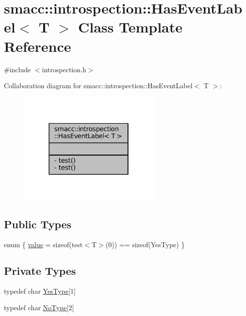 \hypertarget{classsmacc_1_1introspection_1_1HasEventLabel}{}\section{smacc\+:\+:introspection\+:\+:Has\+Event\+Label$<$ T $>$ Class Template Reference}
\label{classsmacc_1_1introspection_1_1HasEventLabel}


{\ttfamily \#include $<$introspection.\+h$>$}



Collaboration diagram for smacc\+:\+:introspection\+:\+:Has\+Event\+Label$<$ T $>$\+:
\nopagebreak
\begin{figure}[H]
\begin{center}
\leavevmode
\includegraphics[width=202pt]{classsmacc_1_1introspection_1_1HasEventLabel__coll__graph}
\end{center}
\end{figure}
\subsection*{Public Types}
\begin{DoxyCompactItemize}
\item 
enum \{ \hyperlink{classsmacc_1_1introspection_1_1HasEventLabel_a2de6073f80d42739c5ed78d301bd853ba3f57db3ac5b424aedec54eb89e48b732}{value} = sizeof(test$<$T$>$(0)) == sizeof(Yes\+Type)
 \}
\end{DoxyCompactItemize}
\subsection*{Private Types}
\begin{DoxyCompactItemize}
\item 
typedef char \hyperlink{classsmacc_1_1introspection_1_1HasEventLabel_a8d4b4c2ecb640812e11e8c1407636b6a}{Yes\+Type}\mbox{[}1\mbox{]}
\item 
typedef char \hyperlink{classsmacc_1_1introspection_1_1HasEventLabel_a91b6dd8a7c59c7f24ef0937c99026e81}{No\+Type}\mbox{[}2\mbox{]}
\end{DoxyCompactItemize}
